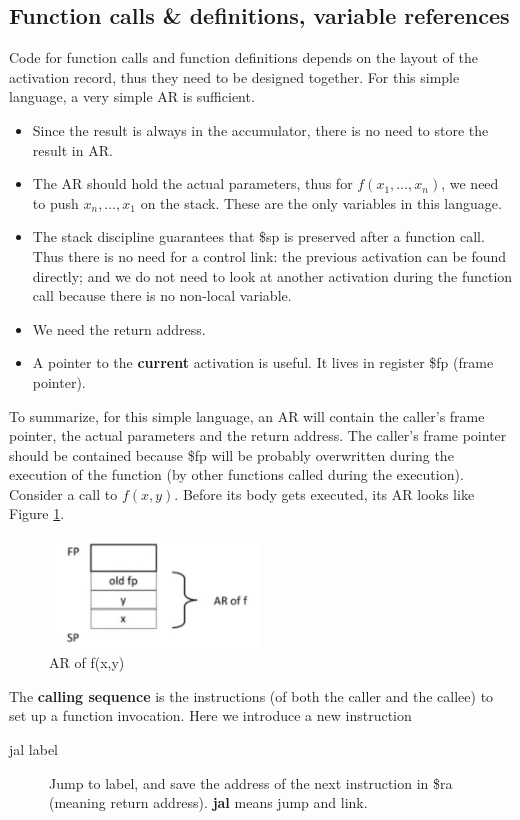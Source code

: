 \subsection{Function calls \& definitions, variable references}
Code for function calls and function definitions depends on the layout of the activation record, thus they need to be designed together. For this simple language, a very simple AR is sufficient. 
\begin{itemize}
\item Since the result is always in the accumulator, there is no need to store the result in AR. 
\item The AR should hold the actual parameters, thus for $f(x_1,\dots,x_n)$, we need to push $x_n,\dots,x_1$ on the stack. These are the only variables in this language. 
\item The stack discipline guarantees that \$sp is preserved after a function call. Thus there is no need for a control link: the previous activation can be found directly; and we do not need to look at another activation during the function call because there is no non-local variable. 
\item We need the return address.
\item A pointer to the \textbf{current} activation is useful. It lives in register \$fp (frame pointer).
\end{itemize}
To summarize, for this simple language, an AR will contain the caller's frame pointer, the actual parameters and the return address. The caller's frame pointer should be contained because \$fp will be probably overwritten during the execution of the function (by other functions called during the execution). Consider a call to $f(x,y)$. Before its body gets executed, its AR looks like Figure \ref{aroff}.
\begin{figure}[H]
\centering
\includegraphics[width=0.5\textwidth]{aroff.jpg}
\caption{AR of f(x,y)}\label{aroff}
\end{figure}
The \textbf{calling sequence} is the instructions (of both the caller and the callee) to set up a function invocation. Here we introduce a new instruction
\begin{description}
\item[jal label] Jump to label, and save the address of the next instruction in \$ra (meaning return address). \textbf{jal} means jump and link.
\end{description}
